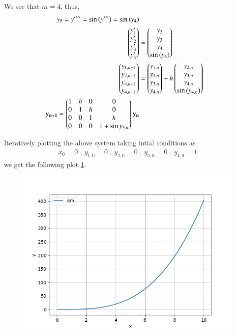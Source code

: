 \documentclass[journal]{IEEEtran}
\begin{document}
We see that $m=4$, thus,
\begin{align}
y_5=y''''=\sin{\ensuremath{\left(y'''\right)}}=\sin{\ensuremath{\left(y_4\right)}}\\
\begin{pmatrix}y_1^{\prime}\\y_2^{\prime}\\y_3^{\prime}\\y_4^{\prime}\end{pmatrix} &= \begin{pmatrix}y_2\\y_3\\y_4\\\sin{\ensuremath{\left(y_4\right)}}\end{pmatrix}\\
\begin{pmatrix}y_{1, n + 1}\\y_{2, n + 1}\\y_{4, n + 1}\\y_{4, n + 1}\end{pmatrix} &= \begin{pmatrix}y_{1, n}\\y_{2, n}\\y_{3, n}\\y_{4, n}\end{pmatrix} + h\begin{pmatrix}y_{2, n}\\y_{3, n}\\y_{4, n}\\\sin{\ensuremath{\left(y_{4,n}\right)}}\end{pmatrix}\\
    \mathbf{y_{n + 1}} = \begin{pmatrix}1 & h & 0 & 0 \\ 0 & 1 & h & 0 \\ 0 & 0 & 1 & h\\0 & 0 & 0 & 1 + \sin{y_{3,n}}\end{pmatrix} \mathbf{y_n}
\end{align}


Iteratively plotting the above system taking intial conditions as 
\begin{align}
    x_0 = 0 \text{ , } y_{1, 0} = 0 \text{ , } y_{2, 0} = 0 \text{ , } y_{3, 0} = 0 \text{ , } y_{4, 0} = 1
\end{align}
we get the following plot \ref{fig-1}.

\begin{figure}[ht!]
   \centering
   \includegraphics[width=\columnwidth]{figs/Figure_1.png}
   \caption{}
   \label{fig-1}
\end{figure}
\end{document}

